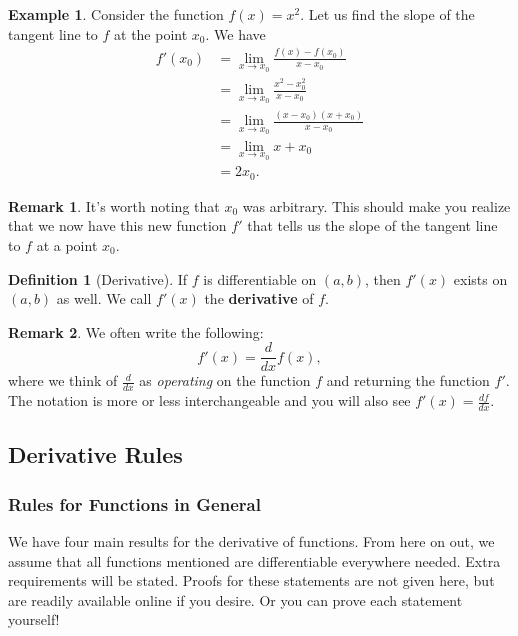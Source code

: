 \documentclass[12pt]{article}
\theoremstyle{definition}
\newtheorem{definition}{Definition}[section]
\newtheorem{example}{Example}[section]
\newtheorem{remark}{Remark}[section]
\begin{document}
\begin{example}
Consider the function $f(x)=x^2.$  Let us find the slope of the tangent line to $f$ at the point $x_0$. We have
\begin{align*}
    f'(x_0)&=\lim_{x\to x_0} \frac{f(x)-f(x_0)}{x-x_0}\\
    &= \lim_{x\to x_0} \frac{x^2-x_0^2}{x-x_0}\\
    &= \lim_{x\to x_0} \frac{(x-x_0)(x+x_0)}{x-x_0}\\
    &= \lim_{x\to x_0} x+x_0\\
    &= 2x_0.
\end{align*}
\end{example}

\begin{remark}
It's worth noting that $x_0$ was arbitrary.  This should make you realize that we now have this new function $f'$ that tells us the slope of the tangent line to $f$ at a point $x_0$.
\end{remark}

\begin{definition}[Derivative]
If $f$ is differentiable on $(a,b)$, then $f'(x)$ exists on $(a,b)$ as well.  We call $f'(x)$ the \textbf{derivative} of $f$.
\end{definition}

\begin{remark}
We often write the following:
\[
f'(x)=\frac{d}{dx} f(x),
\]
where we think of $\frac{d}{dx}$ as \emph{operating} on the function $f$ and returning the function $f'$. The notation is more or less interchangeable and you will also see $f'(x)=\frac{df}{dx}.$
\end{remark}

\subsection{Derivative Rules}

\subsubsection{Rules for Functions in General}

We have four main results for the derivative of functions.  From here on out, we assume that all functions mentioned are differentiable everywhere needed. Extra requirements will be stated. Proofs for these statements are not given here, but are readily available online if you desire. Or you can prove each statement yourself!
\end{document}
